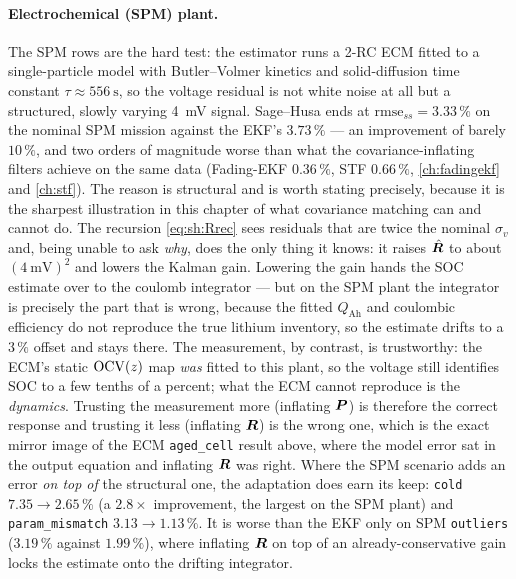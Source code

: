 \paragraph{Electrochemical (SPM) plant.}  The SPM rows are the hard test: the estimator runs a 2-RC
ECM fitted to a single-particle model with Butler--Volmer kinetics and solid-diffusion time constant
$\tau\approx\SI{556}{\second}$, so the voltage residual is not white noise at all but a structured,
slowly varying \SI{4}{\milli\volt} signal.  Sage--Husa ends at $\mathrm{rmse}_{ss}=3.33\,\%$ on the
nominal SPM mission against the EKF's $3.73\,\%$ --- an improvement of barely $10\,\%$, and two
orders of magnitude worse than what the covariance-inflating filters achieve on the same data
(Fading-EKF $0.36\,\%$, STF $0.66\,\%$, \cref{ch:fadingekf} and \cref{ch:stf}).  The reason is
structural and is worth stating precisely, because it is the sharpest illustration in this chapter
of what covariance matching can and cannot do.  The recursion \eqref{eq:sh:Rrec} sees residuals that
are twice the nominal $\sigma_v$ and, being unable to ask \emph{why}, does the only thing it knows:
it raises $\hat{\bm{R}}$ to about $(\SI{4}{\milli\volt})^2$ and lowers the Kalman gain.  Lowering the
gain hands the SOC estimate over to the coulomb integrator --- but on the SPM plant the integrator is
precisely the part that is wrong, because the fitted $Q_\mathrm{Ah}$ and coulombic efficiency do not
reproduce the true lithium inventory, so the estimate drifts to a $3\,\%$ offset and stays there.
The measurement, by contrast, is trustworthy: the ECM's static $\mathrm{OCV}(z)$ map \emph{was} fitted to
this plant, so the voltage still identifies SOC to a few tenths of a percent; what the ECM cannot
reproduce is the \emph{dynamics}.  Trusting the measurement more (inflating $\bm{P}$) is therefore the
correct response and trusting it less (inflating $\bm{R}$) is the wrong one, which is the exact mirror
image of the ECM \texttt{aged\_cell} result above, where the model error sat in the output equation
and inflating $\bm{R}$ was right.  Where the SPM scenario adds an error \emph{on top of} the structural
one, the adaptation does earn its keep: \texttt{cold} $7.35\to2.65\,\%$ (a $2.8\times$ improvement,
the largest on the SPM plant) and \texttt{param\_mismatch} $3.13\to1.13\,\%$.  It is worse than the
EKF only on SPM \texttt{outliers} ($3.19\,\%$ against $1.99\,\%$), where inflating $\bm{R}$ on top of an
already-conservative gain locks the estimate onto the drifting integrator.

